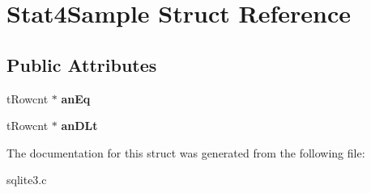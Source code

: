 \hypertarget{structStat4Sample}{}\section{Stat4\+Sample Struct Reference}
\label{structStat4Sample}
\subsection*{Public Attributes}
\begin{DoxyCompactItemize}
\item 
t\+Rowcnt $\ast$ {\bfseries an\+Eq}\hypertarget{structStat4Sample_a8dd17556ec12614fbf4b88ab0bc82749}{}\label{structStat4Sample_a8dd17556ec12614fbf4b88ab0bc82749}

\item 
t\+Rowcnt $\ast$ {\bfseries an\+D\+Lt}\hypertarget{structStat4Sample_a25519389bab21052bf80af8500388a37}{}\label{structStat4Sample_a25519389bab21052bf80af8500388a37}

\end{DoxyCompactItemize}


The documentation for this struct was generated from the following file\+:\begin{DoxyCompactItemize}
\item 
sqlite3.\+c\end{DoxyCompactItemize}
